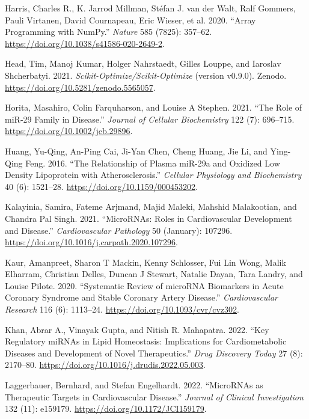 \documentclass[
]{article}
\newlength{\cslhangindent}
\newlength{\cslentryspacingunit} %
\newenvironment{CSLReferences}[2] %
 {%
  \setlength{\parindent}{0pt}
  \ifodd #1
  \let\oldpar\par
  \def\par{\hangindent=\cslhangindent\oldpar}
  \fi
  \setlength{\parskip}{#2\cslentryspacingunit}
 }%
 {}
\begin{document}
\begin{CSLReferences}{1}{0}
\leavevmode{}%
Harris, Charles R., K. Jarrod Millman, Stéfan J. van der Walt, Ralf
Gommers, Pauli Virtanen, David Cournapeau, Eric Wieser, et al. 2020.
{``Array Programming with {NumPy}.''} \emph{Nature} 585 (7825): 357--62.
\url{https://doi.org/10.1038/s41586-020-2649-2}.

\leavevmode{}%
Head, Tim, Manoj Kumar, Holger Nahrstaedt, Gilles Louppe, and Iaroslav
Shcherbatyi. 2021. \emph{Scikit-Optimize/Scikit-Optimize} (version
v0.9.0). Zenodo. \url{https://doi.org/10.5281/zenodo.5565057}.

\leavevmode{}%
Horita, Masahiro, Colin Farquharson, and Louise A Stephen. 2021. {``The
Role of {miR}‐29 Family in Disease.''} \emph{Journal of Cellular
Biochemistry} 122 (7): 696--715.
\url{https://doi.org/10.1002/jcb.29896}.

\leavevmode{}%
Huang, Yu-Qing, An-Ping Cai, Ji-Yan Chen, Cheng Huang, Jie Li, and
Ying-Qing Feng. 2016. {``The {Relationship} of {Plasma} {miR}-29a and
{Oxidized} {Low} {Density} {Lipoprotein} with {Atherosclerosis}.''}
\emph{Cellular Physiology and Biochemistry} 40 (6): 1521--28.
\url{https://doi.org/10.1159/000453202}.

\leavevmode{}%
Kalayinia, Samira, Fateme Arjmand, Majid Maleki, Mahshid Malakootian,
and Chandra Pal Singh. 2021. {``{MicroRNAs}: Roles in Cardiovascular
Development and Disease.''} \emph{Cardiovascular Pathology} 50
(January): 107296. \url{https://doi.org/10.1016/j.carpath.2020.107296}.

\leavevmode{}%
Kaur, Amanpreet, Sharon T Mackin, Kenny Schlosser, Fui Lin Wong, Malik
Elharram, Christian Delles, Duncan J Stewart, Natalie Dayan, Tara
Landry, and Louise Pilote. 2020. {``Systematic Review of {microRNA}
Biomarkers in Acute Coronary Syndrome and Stable Coronary Artery
Disease.''} \emph{Cardiovascular Research} 116 (6): 1113--24.
\url{https://doi.org/10.1093/cvr/cvz302}.

\leavevmode{}%
Khan, Abrar A., Vinayak Gupta, and Nitish R. Mahapatra. 2022. {``Key
Regulatory {miRNAs} in Lipid Homeostasis: {Implications} for
Cardiometabolic Diseases and Development of Novel Therapeutics.''}
\emph{Drug Discovery Today} 27 (8): 2170--80.
\url{https://doi.org/10.1016/j.drudis.2022.05.003}.

\leavevmode{}%
Laggerbauer, Bernhard, and Stefan Engelhardt. 2022. {``{MicroRNAs} as
Therapeutic Targets in Cardiovascular Disease.''} \emph{Journal of
Clinical Investigation} 132 (11): e159179.
\url{https://doi.org/10.1172/JCI159179}.


\end{CSLReferences}
\end{document}
